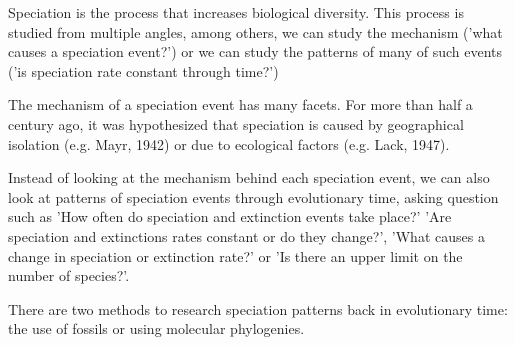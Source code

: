 Speciation is the process that increases biological diversity.
This process is studied from multiple angles, among others,
we can study the mechanism ('what
causes a speciation event?') or we can study the patterns of many
of such events ('is speciation rate constant through time?')

%
%

The mechanism of a speciation event has many facets.
For more than half a century ago, it was hypothesized
that speciation is caused by geographical isolation (e.g. Mayr, 1942)
or due to ecological factors (e.g. Lack, 1947).

%

Instead of looking at the mechanism behind each speciation event,
we can also look at patterns of speciation events through evolutionary time,
asking question such as 'How often do speciation and extinction events take place?'
'Are speciation and extinctions rates constant or do they change?',
'What causes a change in speciation or extinction rate?' or
'Is there an upper limit on the number of species?'.

There are two methods to research speciation patterns back in evolutionary time:
the use of fossils or using molecular phylogenies.

